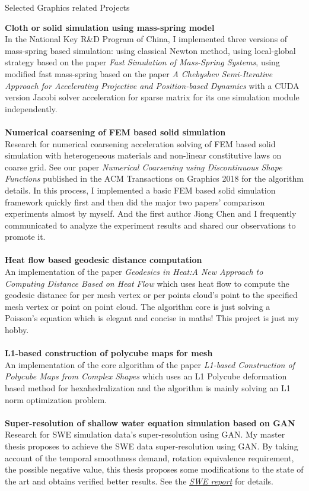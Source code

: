 \documentclass{resume} %
\begin{document}
\begin{rSection}{Selected Graphics related Projects}

  {\bf Cloth or solid simulation using mass-spring model}\\In the National Key R\&D Program of China, I implemented three versions of mass-spring based simulation: using classical Newton method, using local-global strategy based on the paper \textit{Fast Simulation of Mass-Spring Systems}, using modified fast mass-spring based on the paper \textit{A Chebyshev Semi-Iterative Approach for Accelerating Projective and Position-based Dynamics} with a CUDA version Jacobi solver acceleration for sparse matrix for its one simulation module independently.\\
  \\{\bf Numerical coarsening of FEM based solid simulation}\\ Research for numerical coarsening acceleration solving of FEM based solid simulation with heterogeneous materials and non-linear constitutive laws on coarse grid. See our paper \emph{Numerical Coarsening using Discontinuous Shape Functions} published in the ACM Transactions on Graphics 2018 for the algorithm details. In this process, I implemented a basic FEM based solid simulation framework quickly first and then did the major two papers' comparison experiments almost by myself. And the first author Jiong Chen and I frequently communicated to analyze the experiment results and shared our observations to promote it. \\
  \\{\bf Heat flow based geodesic distance computation}\\An implementation of the paper \emph{Geodesics in Heat:A New Approach to Computing Distance Based on Heat Flow} which uses heat flow to compute the geodesic distance for per mesh vertex or per points cloud's point to the specified mesh vertex or point on point cloud. The algorithm core is just solving a Poisson's equation which is elegant and concise in maths! This project is just my hobby.\\
  \\{\bf L1-based construction of polycube maps for mesh}\\ An implementation of the core algorithm of the paper \emph{L1-based Construction of Polycube Maps from Complex Shapes} which uses an L1 Polycube deformation based method for hexahedralization and the algorithm is mainly solving an L1 norm optimization problem.\\
  \\{\bf Super-resolution of shallow water equation simulation based on GAN}\\ Research for SWE simulation data's super-resolution using GAN. My master thesis proposes to achieve the SWE data super-resolution using GAN. By taking account of the temporal smoothness demand, rotation equivalence requirement, the possible negative value, this thesis proposes some modifications to the state of the art and obtains verified better results. See the \emph{\href{https://wtyatzoo.github.io/reports/SWE.pdf}{SWE report}} for details. \\

\end{rSection}
\end{document}
